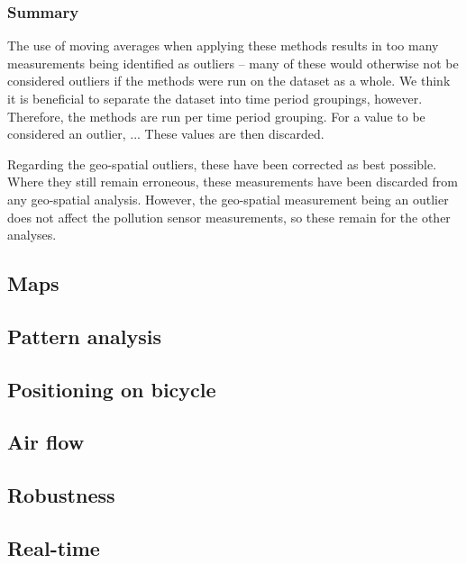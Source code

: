\documentclass[11pt]{report}
\begin{document}
\subsubsection{Summary}

The use of moving averages when applying these methods results in too many measurements being identified as outliers -- many of these would otherwise not be considered outliers if the methods were run on the dataset as a whole. We think it is beneficial to separate the dataset into time period groupings, however. Therefore, the methods are run per time period grouping. For a value to be considered an outlier, ... These values are then discarded.

Regarding the geo-spatial outliers, these have been corrected as best possible. Where they still remain erroneous, these measurements have been discarded from any geo-spatial analysis. However, the geo-spatial measurement being an outlier does not affect the pollution sensor measurements, so these remain for the other analyses.


\subsection{Maps}

\subsection{Pattern analysis}

\subsection{Positioning on bicycle}

\subsection{Air flow}

\subsection{Robustness}

\subsection{Real-time}
\end{document}
